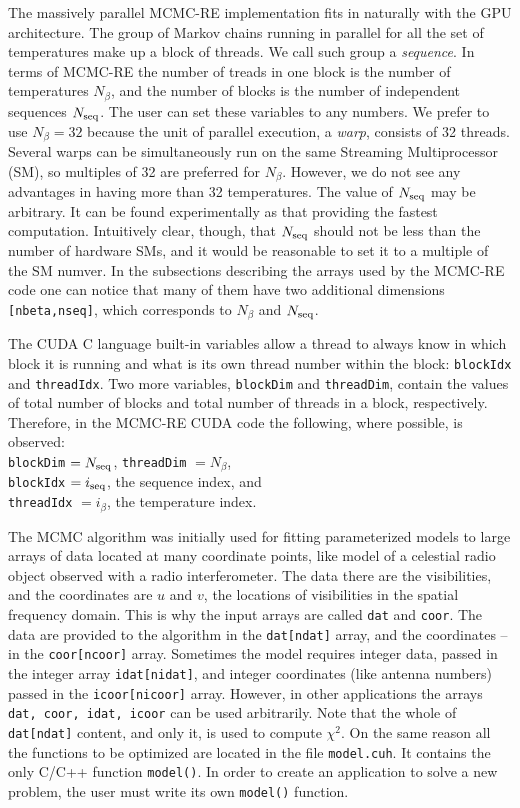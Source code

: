 \documentclass[preprint2]{aastex}
\begin{document}
The massively parallel MCMC-RE implementation fits in naturally with the
GPU architecture. The group of Markov chains running in parallel for all the set 
of temperatures make up a block of threads. We call such group a \emph{sequence}.
In terms of MCMC-RE the number of treads in one block is the number of 
temperatures $N_\beta$, and the number of blocks is the number of independent
sequences $N_{\rm seq}$. The user can set these variables to any numbers.
We prefer to use $N_\beta = 32$ because the unit of parallel execution, a
\emph{warp}, consists of 32 threads. Several warps can be simultaneously 
run on the same Streaming Multiprocessor (SM), so multiples of 32 are
preferred for $N_\beta$. However, we do not see any advantages in having
more than 32 temperatures.  The value of $N_{\rm seq}$ may be arbitrary.
It can be found experimentally as that providing the fastest computation. 
Intuitively clear, though, that $N_{\rm seq}$ should not be less than the
number of hardware SMs, and it would be reasonable to set it to a multiple
of the SM numver. In the subsections describing the arrays
used by the MCMC-RE code one can notice that many of them have 
two additional dimensions \verb|[nbeta,nseq]|, which corresponds to
$N_\beta$ and $N_{\rm seq}$.

The CUDA C language built-in variables allow a thread to always
know in which block it is running and what is its own thread number 
within the block: \verb|blockIdx| and \verb|threadIdx|. Two more variables,
\verb|blockDim| and \verb|threadDim|, contain the values of total number
of blocks and total number of threads in a block, respectively. Therefore,
in the MCMC-RE CUDA code the following, where possible, is observed: \\
\verb|blockDim| $ = N_{\rm seq}$, \verb|threadDim| $ = N_\beta$, \\
\verb|blockIdx| $ = i_{\rm seq}$, the sequence index, and \\
\verb|threadIdx| $ = i_\beta$, the temperature index. 

The MCMC algorithm was initially used for fitting parameterized models
to large arrays of data located at many coordinate points, like model 
of a celestial radio object observed with a radio interferometer. 
The data there are the visibilities, and the coordinates are
$u$ and $v$, the locations of visibilities in the spatial frequency domain.
This is why the input arrays are called \verb|dat| and \verb|coor|.
The data are provided to the algorithm in the \verb|dat[ndat]| array, and
the coordinates -- in the \verb|coor[ncoor]| array.  
Sometimes the model requires
integer data, passed in the integer array \verb|idat[nidat]|, and integer
coordinates (like antenna numbers) passed in the \verb|icoor[nicoor]| array.
However,  in other applications the arrays \verb|dat, coor, idat, icoor| 
can be used arbitrarily. Note that the whole of \verb|dat[ndat]| content, 
and only it, is used to compute $\chi^2$. On the same reason all the functions
to be optimized are located in the file \verb|model.cuh|. It contains the 
only C/C++ function \verb|model()|. In order to create an application to
solve a new problem, the user must write its own \verb|model()| function.
\end{document}
